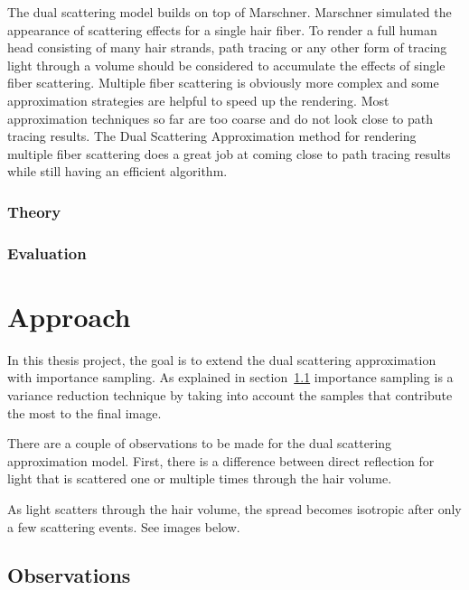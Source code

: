 \documentclass[11pt,a4paper]{report}
\begin{document}
The dual scattering model builds on top of Marschner. Marschner simulated the appearance of scattering effects for a single hair fiber. To render a full human head consisting of many hair strands, path tracing or any other form of tracing light through a volume should be considered to accumulate the effects of single fiber scattering. Multiple fiber scattering is obviously more complex and some approximation strategies are helpful to speed up the rendering. Most approximation techniques so far are too coarse and do not look close to path tracing results. The Dual Scattering Approximation method for rendering multiple fiber scattering does a great job at coming close to path tracing results while still having an efficient algorithm.

\subsection{Theory}

\subsection{Evaluation}



%
%

\chapter{Approach}

In this thesis project, the goal is to extend the dual scattering approximation with importance sampling. As explained in section~\ref{} importance sampling is a variance reduction technique by taking into account the samples that contribute the most to the final image.

There are a couple of observations to be made for the dual scattering approximation model. First, there is a difference between direct reflection for light that is scattered one or multiple times through the hair volume.

As light scatters through the hair volume, the spread becomes isotropic after only a few scattering events. See images below.

\section{Observations}
\end{document}
